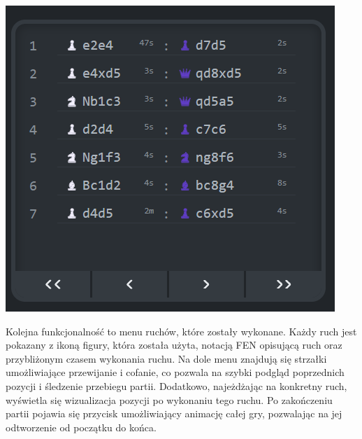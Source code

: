 \documentclass[12pt,a4paper]{article}
\begin{document}
\begin{minipage}[t]{0.45\textwidth} 
    \vspace{0pt} 
    \centering 
    \includegraphics[width=\linewidth]{images/ins_min_moves.png} 
\end{minipage} 
\hfill 
\begin{minipage}[t]{0.45\textwidth} 
    \vspace{0pt} 
    \raggedright 
    Kolejna funkcjonalność to menu ruchów, które zostały wykonane. Każdy ruch jest pokazany z ikoną figury, która została użyta, notacją FEN opisującą ruch oraz przybliżonym czasem wykonania ruchu. Na dole menu znajdują się strzałki umożliwiające przewijanie i cofanie, co pozwala na szybki podgląd poprzednich pozycji i śledzenie przebiegu partii. Dodatkowo, najeżdżając na konkretny ruch, wyświetla się wizualizacja pozycji po wykonaniu tego ruchu. Po zakończeniu partii pojawia się przycisk umożliwiający animację całej gry, pozwalając na jej odtworzenie od początku do końca.
\end{minipage}

\vspace{1cm}
\end{document}
